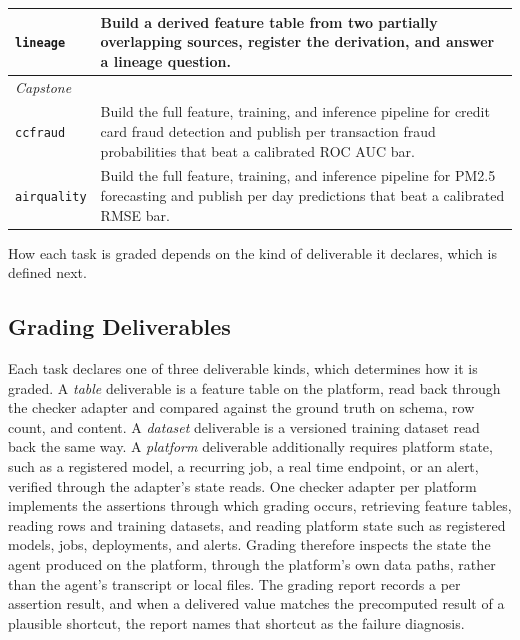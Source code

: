\documentclass[
english,                 %
bibtex,                  %
]{kththesis}
\numberwithin{listing}{chapter}
\begin{document}
{\begin{longtable}{@{}lp{\dimexpr\textwidth-4.8cm\relax}@{}}
        \texttt{lineage} & Build a derived feature table from two partially overlapping sources, register the derivation, and answer a lineage question. \\
        \midrule
        \multicolumn{2}{l}{\textit{Capstone}} \\
        \texttt{ccfraud} & Build the full feature, training, and inference pipeline for credit card fraud detection and publish per transaction fraud probabilities that beat a calibrated \gls{ROC} \gls{AUC} bar. \\
        \texttt{airquality} & Build the full feature, training, and inference pipeline for \gls{PM2.5} forecasting and publish per day predictions that beat a calibrated \gls{RMSE} bar. \\

\end{longtable}}

How each task is graded depends on the kind of deliverable it declares, which is defined next.

\subsection{Grading Deliverables}
\label{sec:method_grading_deliverables}
\glsresetall

Each task declares one of three deliverable kinds, which determines how it is graded. A \emph{table} deliverable is a feature table on the platform, read back through the checker adapter and compared against the ground truth on schema, row count, and content. A \emph{dataset} deliverable is a versioned training dataset read back the same way. A \emph{platform} deliverable additionally requires platform state, such as a registered model, a recurring job, a real time endpoint, or an alert, verified through the adapter's state reads.
One checker adapter per platform implements the assertions through which grading occurs, retrieving feature tables, reading rows and training datasets, and reading platform state such as registered models, jobs, deployments, and alerts. Grading therefore inspects the state the agent produced on the platform, through the platform's own data paths, rather than the agent's transcript or local files. The grading report records a per assertion result, and when a delivered value matches the precomputed result of a plausible shortcut, the report names that shortcut as the failure diagnosis.
\end{document}
